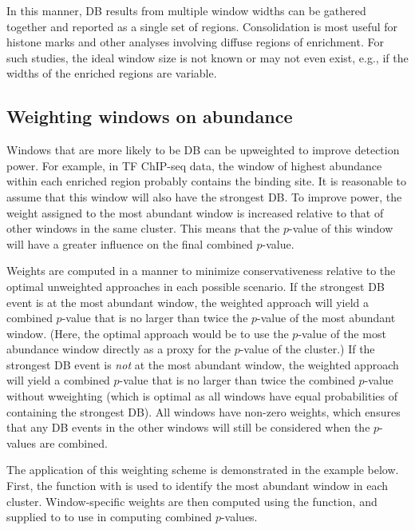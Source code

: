 \documentclass{report}\usepackage[]{graphicx}\usepackage[usenames,dvipsnames]{color}
\begin{document}
In this manner, DB results from multiple window widths can be gathered together and reported as a single set of regions.
Consolidation is most useful for histone marks and other analyses involving diffuse regions of enrichment.
For such studies, the ideal window size is not known or may not even exist, e.g., if the widths of the enriched regions are variable.

\subsection{Weighting windows on abundance}
Windows that are more likely to be DB can be upweighted to improve detection power.
For example, in TF ChIP-seq data, the window of highest abundance within each enriched region probably contains the binding site.
It is reasonable to assume that this window will also have the strongest DB.
To improve power, the weight assigned to the most abundant window is increased relative to that of other windows in the same cluster.
This means that the $p$-value of this window will have a greater influence on the final combined $p$-value.

Weights are computed in a manner to minimize conservativeness relative to the optimal unweighted approaches in each possible scenario. 
If the strongest DB event is at the most abundant window, the weighted approach will yield a combined $p$-value that is no larger than twice the $p$-value of the most abundant window.
(Here, the optimal approach would be to use the $p$-value of the most abundance window directly as a proxy for the $p$-value of the cluster.)
If the strongest DB event is \emph{not} at the most abundant window, the weighted approach will yield a combined $p$-value that is no larger than twice the combined $p$-value without wweighting (which is optimal as all windows have equal probabilities of containing the strongest DB).
All windows have non-zero weights, which ensures that any DB events in the other windows will still be considered when the $p$-values are combined.

The application of this weighting scheme is demonstrated in the example below.
First, the  function with  is used to identify the most abundant window in each cluster.
Window-specific weights are then computed using the  function, and supplied to  to use in computing combined $p$-values.
\end{document}
